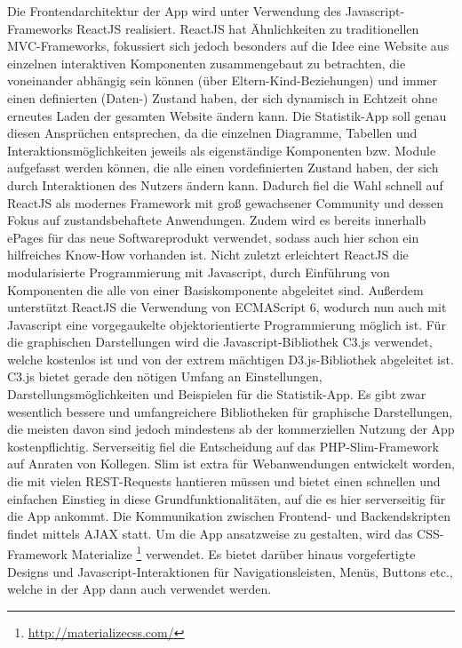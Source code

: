 Die Frontendarchitektur der App wird unter Verwendung des Javascript-Frameworks ReactJS realisiert. ReactJS hat Ähnlichkeiten zu traditionellen \acs{MVC-Frameworks}, fokussiert sich jedoch besonders auf die Idee eine Website aus einzelnen interaktiven Komponenten zusammengebaut zu betrachten, die voneinander abhängig sein können (über Eltern-Kind-Beziehungen) und immer einen definierten (Daten-) Zustand haben, der sich dynamisch in Echtzeit ohne erneutes Laden der gesamten Website ändern kann.
Die Statistik-App soll genau diesen Ansprüchen entsprechen, da die einzelnen Diagramme, Tabellen und Interaktionsmöglichkeiten jeweils als eigenständige Komponenten bzw. Module aufgefasst werden können, die alle einen vordefinierten Zustand haben, der sich durch Interaktionen des Nutzers ändern kann. Dadurch fiel die Wahl schnell auf ReactJS als modernes Framework mit groß gewachsener Community und dessen Fokus auf zustandsbehaftete Anwendungen. Zudem wird es bereits innerhalb ePages für das neue Softwareprodukt verwendet, sodass auch hier schon ein hilfreiches Know-How vorhanden ist. Nicht zuletzt erleichtert ReactJS die modularisierte Programmierung mit Javascript, durch Einführung von Komponenten die alle von einer Basiskomponente abgeleitet sind. Außerdem unterstützt ReactJS die Verwendung von ECMAScript 6, wodurch nun auch mit Javascript eine vorgegaukelte objektorientierte Programmierung möglich ist.
Für die graphischen Darstellungen wird die Javascript-Bibliothek C3.js verwendet, welche kostenlos ist und von der extrem mächtigen D3.js-Bibliothek abgeleitet ist. C3.js bietet gerade den nötigen Umfang an Einstellungen, Darstellungsmöglichkeiten und Beispielen für die Statistik-App. Es gibt zwar wesentlich bessere und umfangreichere Bibliotheken für graphische Darstellungen, die meisten davon sind jedoch mindestens ab der kommerziellen Nutzung der App kostenpflichtig.
Serverseitig fiel die Entscheidung auf das PHP-Slim-Framework auf Anraten von Kollegen. Slim ist extra für Webanwendungen entwickelt worden, die mit vielen REST-Requests hantieren müssen und bietet einen schnellen und einfachen Einstieg in diese Grundfunktionalitäten, auf die es hier serverseitig für die App ankommt.
Die Kommunikation zwischen Frontend- und Backendskripten findet mittels AJAX statt.
Um die App ansatzweise  zu gestalten, wird das CSS-Framework Materialize \footnote{\url{http://materializecss.com/}} verwendet. Es bietet darüber hinaus vorgefertigte Designs und Javascript-Interaktionen für Navigationsleisten, Menüs, Buttons etc., welche in der App dann auch verwendet werden.

